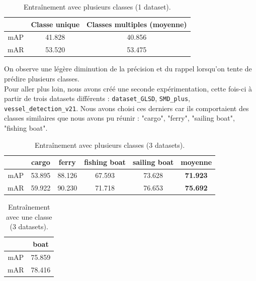 \begin{table}[h]
    \begin{center}
        \begin{tabular}{c c c}
            \hline
            & Classe unique & Classes multiples (moyenne) \\
            \hline
            mAP & 41.828 & 40.856 \\
            mAR & 53.520 & 53.475 \\
        \end{tabular}
    \end{center}
    \caption{Entraînement avec plusieurs classes (1 dataset).}
\end{table}

On observe une légère diminution de la précision et du rappel lorsqu'on tente de prédire plusieurs
classes. \\

Pour aller plus loin, nous avons créé une seconde expérimentation, cette fois-ci à partir
de trois datasets différents : \texttt{dataset\_GLSD}, \texttt{SMD\_plus}, \texttt{vessel\_detection\_v21}.
Nous avons choisi ces derniers car ils comportaient des classes similaires que nous avons pu réunir :
"cargo", "ferry", "sailing boat", "fishing boat". \\

\begin{table}[H]
    \begin{center}
        \begin{tabular}{c c c c c c}
            \hline
            & cargo & ferry & fishing boat & sailing boat & \textbf{moyenne} \\
            \hline
            mAP & 53.895 & 88.126 & 67.593 & 73.628 & \textbf{71.923}\\
            mAR & 59.922 & 90.230 & 71.718 & 76.653 & \textbf{75.692}\\
        \end{tabular}
    \end{center}
    \caption{Entraînement avec plusieurs classes (3 datasets).}
\end{table}

\begin{table}[H]
    \begin{center}
        \begin{tabular}{c c}
            \hline
            & boat  \\
            \hline
            mAP & 75.859 \\
            mAR & 78.416 \\
        \end{tabular}
    \end{center}
    \caption{Entraînement avec une classe (3 datasets).}
\end{table}

